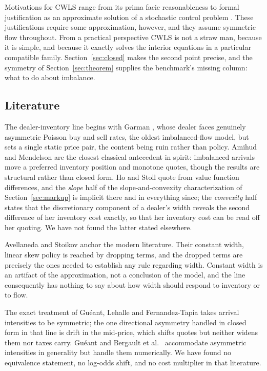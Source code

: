 \documentclass[11pt]{article}
\begin{document}
Motivations for CWLS range from its prima facie reasonableness to formal justification as an approximate solution of a stochastic control problem \cite{avellaneda2008,glft2012}. These justifications require some approximation, however, and they assume symmetric flow throughout. From a practical perspective CWLS is not a straw man, because it is simple, and because it exactly solves the interior equations in a particular compatible family. Section~\ref{sec:closed} makes the second point precise, and the symmetry of Section~\ref{sec:theorem} supplies the benchmark's missing column: what to do about imbalance.

\subsection{Literature}\label{sec:literature}

The dealer-inventory line begins with Garman \cite{garman1976}, whose dealer faces genuinely asymmetric Poisson buy and sell rates, the oldest imbalanced-flow model, but sets a single static price pair, the content being ruin rather than policy. Amihud and Mendelson \cite{amihud1980} are the closest classical antecedent in spirit: imbalanced arrivals move a preferred inventory position and monotone quotes, though the results are structural rather than closed form. Ho and Stoll \cite{hostoll1981} quote from value function differences, and the \emph{slope} half of the slope-and-convexity characterization of Section~\ref{sec:markup} is implicit there and in everything since; the \emph{convexity} half states that the discretionary component of a dealer's width reveals the second difference of her inventory cost exactly, so that her inventory cost can be read off her quoting. We have not found the latter stated elsewhere.

Avellaneda and Stoikov \cite{avellaneda2008} anchor the modern literature. Their constant width, linear skew policy is reached by dropping terms, and the dropped terms are precisely the ones needed to establish any rule regarding width. Constant width is an artifact of the approximation, not a conclusion of the model, and the line consequently has nothing to say about how width should respond to inventory or to flow.

The exact treatment of Gu\'eant, Lehalle and Fernandez-Tapia \cite{glft2012} takes arrival intensities to be symmetric; the one directional asymmetry handled in closed form in that line is drift in the mid-price, which shifts quotes but neither widens them nor taxes carry. Gu\'eant \cite{gueant2016,gueant2017} and Bergault et al.\ \cite{bergaultgueant2021,bergault2021closed} accommodate asymmetric intensities in generality but handle them numerically. We have found no equivalence statement, no log-odds shift, and no cost multiplier in that literature.
\end{document}
